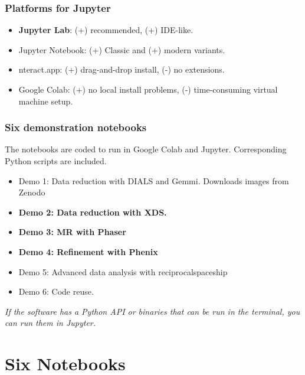 
\begin{frame}[fragile]
\frametitle{Platforms for Jupyter}
\Large{
\begin{itemize}[font=$\bullet$\scshape\bfseries]
    \item \textbf{Jupyter Lab}:  (+) recommended, (+) IDE-like.
    \item Jupyter Notebook: (+) Classic and (+) modern variants.
    \item nteract.app: (+) drag-and-drop install, (-) no extensions.
    \item Google Colab: (+) no local install problems, (-) time-consuming virtual machine setup.
\end{itemize}
}
\end{frame}
\note{
}


\begin{frame}[fragile]
\frametitle{Six demonstration notebooks}
The notebooks are coded to run in Google Colab and Jupyter. Corresponding Python scripts are included.
\begin{itemize}[font=$\bullet$\scshape\bfseries]
    \item Demo 1: Data reduction with DIALS and Gemmi. Downloads images from Zenodo
    \item \textbf{Demo 2: Data reduction with XDS.}
    \item \textbf{Demo 3: MR with Phaser}
    \item \textbf{Demo 4: Refinement with Phenix}
    \item Demo 5: Advanced data analysis with reciprocalspaceship
    \item Demo 6: Code reuse.
\end{itemize}
\vfill
\emph{If the software has a Python API or binaries that can be run in the terminal, you can run them in Jupyter.}
\end{frame}
\note{
}


\section{Six Notebooks}
